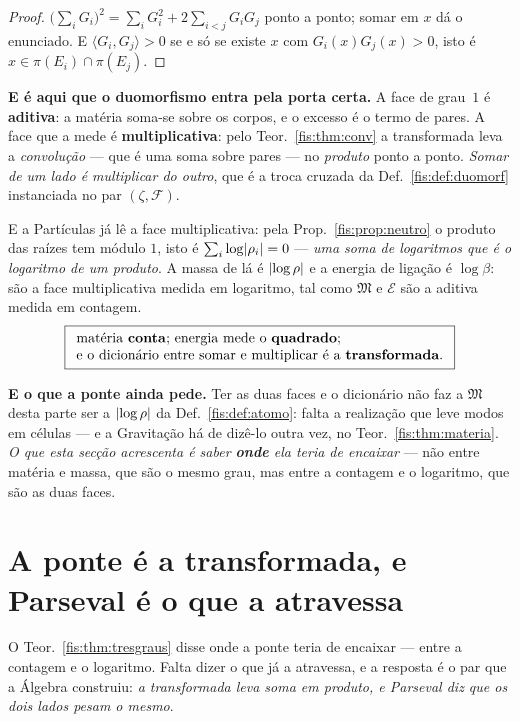 \documentclass[livro.tex]{subfiles}
\begin{document}
\begin{proof}
$\bigl(\sum_i G_i\bigr)^{2}=\sum_i G_i^{2}+2\sum_{i<j}G_iG_j$ ponto a ponto;
somar em $x$ dá o enunciado. E $\langle G_i,G_j\rangle>0$ se e só se existe $x$
com $G_i(x)G_j(x)>0$, isto é $x\in\pi(E_i)\cap\pi(E_j)$.
\end{proof}

\medskip\noindent\textbf{E é aqui que o duomorfismo entra pela porta certa.} A
face de grau~$1$ é \textbf{aditiva}: a matéria soma-se sobre os corpos, e o
excesso é o termo de pares. A face que a mede é \textbf{multiplicativa}: pelo
Teor.~\ref{fis:thm:conv} a transformada leva a \emph{convolução} --- que é uma
soma sobre pares --- no \emph{produto} ponto a ponto. \emph{Somar de um lado é
multiplicar do outro}, que é a troca cruzada da Def.~\ref{fis:def:duomorf}
instanciada no par $(\zeta,\mathcal{F})$.

\medskip\noindent E a Partículas já lê a face multiplicativa: pela
Prop.~\ref{fis:prop:neutro} o produto das raízes tem módulo $1$, isto é
$\sum_i\log\lvert \rho_i\rvert=0$ --- \emph{uma soma de logaritmos que é o logaritmo de
um produto}. A massa de lá é $\lvert \log\rho\rvert$ e a energia de ligação é
$\log\beta$: são a face multiplicativa medida em logaritmo, tal como
$\mathfrak{M}$ e $\mathcal{E}$ são a aditiva medida em contagem.
\[
\boxed{
\begin{array}{l}
\text{matéria \textbf{conta}; energia mede o \textbf{quadrado};}\\
\text{e o dicionário entre somar e multiplicar é a \textbf{transformada}.}
\end{array}}
\]

\medskip\noindent\textbf{E o que a ponte ainda pede.} Ter as duas faces e o
dicionário não faz a $\mathfrak{M}$ desta parte ser a $\lvert \log\rho\rvert$ da
Def.~\ref{fis:def:atomo}: falta a realização que leve modos em células --- e a
Gravitação há de dizê-lo outra vez, no Teor.~\ref{fis:thm:materia}. \emph{O que esta secção acrescenta é
saber \textbf{onde} ela teria de encaixar} --- não entre matéria e massa, que são
o mesmo grau, mas entre a contagem e o logaritmo, que são as duas faces.

\section{A ponte é a transformada, e Parseval é o que a atravessa}\label{fis:topo-ponte}

\noindent O Teor.~\ref{fis:thm:tresgraus} disse onde a ponte teria de encaixar ---
entre a contagem e o logaritmo. Falta dizer o que já a atravessa, e a resposta é
o par que a Álgebra construiu: \emph{a transformada leva soma em produto, e
Parseval diz que os dois lados pesam o mesmo}.
\end{document}
